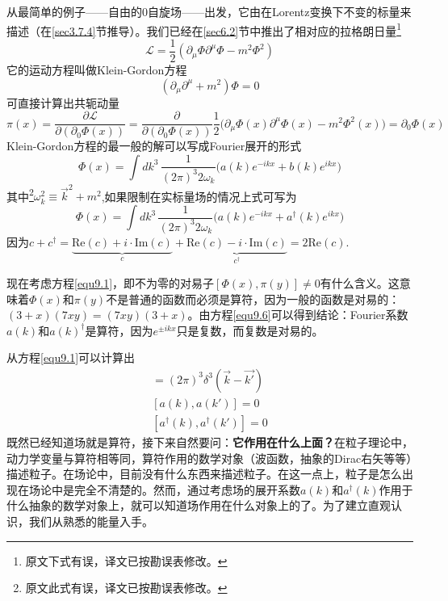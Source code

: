从最简单的例子——自由的$0$自旋场——出发，它由在Lorentz变换下不变的标量来描述（在\ref{sec3.7.4}节推导）。我们已经在\ref{sec6.2}节中推出了相对应的拉格朗日量\footnote{原文下式有误，译文已按勘误表修改。}
\begin{equation} \label{equ9.3}
    \mathscr{L}=\frac{1}{2}(\partial_{\mu}\Phi \partial^{\mu}\Phi-m^{2}\Phi^{2})
\end{equation}
它的运动方程叫做Klein-Gordon方程
\begin{equation} \label{equ9.4}
    (\partial_{\mu}\partial^{\mu}+m^{2})\Phi=0
\end{equation}
可直接计算出共轭动量
\[
    \pi(x)=\frac{\partial \mathscr{L}}{\partial( \partial_{0}\Phi(x))}=\frac{\partial}{\partial(\partial_{0}\Phi(x))} \frac{1}{2} \Big(\partial_{\mu}\Phi(x)\partial^{\mu}\Phi(x)-m^{2}\Phi^{2}(x) \Big) = \partial_{0}\Phi(x)
\]
Klein-Gordon方程的最一般的解可以写成Fourier展开的形式
\begin{equation} \label{equ9.5}
	\Phi(x)=\int dk^{3}\, \frac{1}{(2\pi)^{3}2\omega_{k}} \big( a(k) e^{-ikx} + b(k) e^{ikx} \big)
\end{equation}
其中\footnote{原文此式有误，译文已按勘误表修改。}$\omega_k^{2} \equiv \vec{k}^{2} + m^{2}$,如果限制在实标量场的情况上式可写为
\begin{equation} \label{equ9.6}
	\Phi(x)=\int dk^{3}\, \frac{1}{(2\pi)^{3}2\omega_{k}} \big( a(k)e^{-ikx}+a^{\dag}(k)e^{ikx} \big)
\end{equation}
因为$c+c^{\dag}=\underbrace{\text{Re}(c)+i \cdot \text{Im}(c)}_{c}+\underbrace{\text{Re}(c)-i \cdot \text{Im}(c)}_{c^{\dag}}=2\text{Re}(c)$.

现在考虑方程\eqref{equ9.1}，即不为零的对易子$[\Phi(x),\pi(y)]\neq 0$有什么含义。这意味着$\Phi(x)$和$\pi(y)$不是普通的函数而必须是算符，因为一般的函数是对易的：$(3+x)(7xy)=(7xy)(3+x)$。由方程\eqref{equ9.6}可以得到结论：Fourier系数$a(k)$和$a(k)^{\dag}$是算符，因为$e^{\pm ikx}$只是复数，而复数是对易的。

从方程\eqref{equ9.1}可以计算出
\begin{align}
	[a(k),a^{\dag}(k')]=(2\pi)^{3}\delta^{3}(\vec{k}-\vec{k'}) \label{equ9.7} \\
	[a(k),a(k')]=0 \label{equ9.8} \\
	[a^{\dag}(k),a^{\dag}(k')]=0 \label{equ9.9}
\end{align}
既然已经知道场就是算符，接下来自然要问：{\bfseries 它作用在什么上面？}在粒子理论中，动力学变量与算符相等同，算符作用的数学对象（波函数，抽象的Dirac右矢等等）描述粒子。在场论中，目前没有什么东西来描述粒子。在这一点上，粒子是怎么出现在场论中是完全不清楚的。然而，通过考虑场的展开系数$a(k)$和$a^{\dag}(k)$作用于什么抽象的数学对象上，就可以知道场作用在什么对象上的了。为了建立直观认识，我们从熟悉的能量入手。

